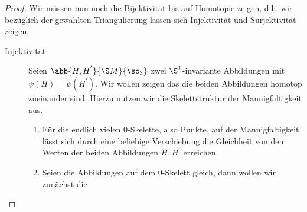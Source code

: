 \begin{Satz}
\begin{proof}
          Wir müssen nun noch die Bijektivität bis auf Homotopie zeigen,
          d.h. wir bezüglich der gewählten Triangulierung lassen sich
          Injektivität und Surjektivität zeigen.
          
          \begin{description}
	          	\item[Injektivität:] Seien $ \abb{H,H^{'}}{\S M}{\so_3} $
	          	zwei $ \S^1 $-invariante Abbildungen mit $ \psi(H)=\psi(H^{'}) $. Wir wollen zeigen das die beiden
	          	Abbildungen homotop zueinander sind. Hierzu nutzen wir
	          	die Skelettstruktur der Mannigfaltigkeit aus.
		          	\begin{enumerate}
		          		\item Für die endlich vielen $ 0 $-Skelette, also
		          		Punkte, auf der Mannigfaltigkeit lässt sich durch
		          		eine beliebige Verschiebung die Gleichheit von
		          		den Werten der beiden Abbildungen $ H,H^{'} $
		          		erreichen.
		          		\item Seien die Abbildungen auf dem $ 0 $-Skelett
		          		gleich, dann wollen wir zunächst die
		          	\end{enumerate}
          \end{description}
          

\end{proof}
\end{Satz}

